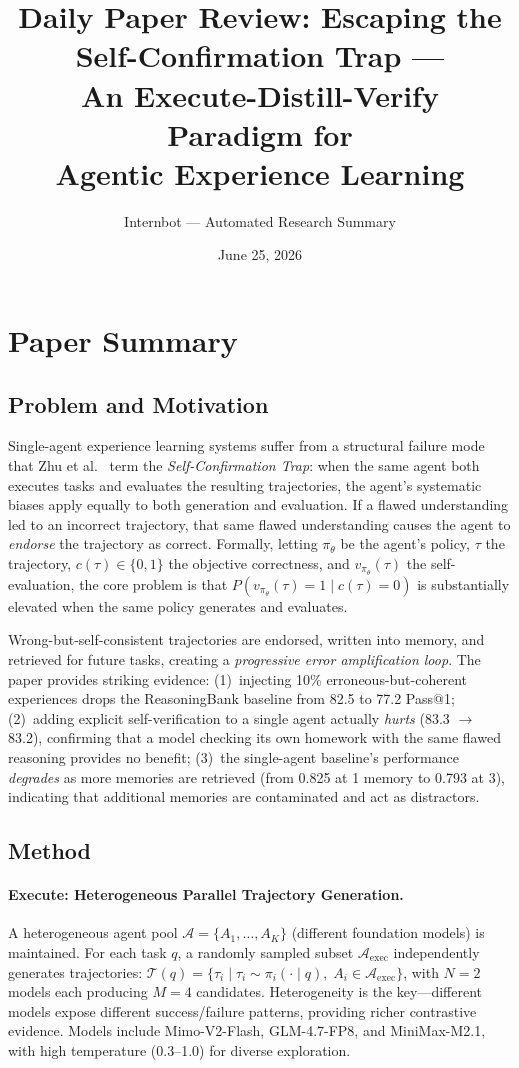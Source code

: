 \documentclass[11pt,a4paper]{article}
\title{Daily Paper Review: Escaping the Self-Confirmation Trap ---\\An Execute-Distill-Verify Paradigm for\\Agentic Experience Learning}
\author{Internbot --- Automated Research Summary}
\date{June 25, 2026}
\begin{document}
\maketitle

\section{Paper Summary}

\subsection{Problem and Motivation}

Single-agent experience learning systems suffer from a structural failure mode that Zhu et al.~\cite{zhu2026edv} term the \emph{Self-Confirmation Trap}: when the same agent both executes tasks and evaluates the resulting trajectories, the agent's systematic biases apply equally to both generation and evaluation. If a flawed understanding led to an incorrect trajectory, that same flawed understanding causes the agent to \emph{endorse} the trajectory as correct. Formally, letting $\pi_\theta$ be the agent's policy, $\tau$ the trajectory, $c(\tau) \in \{0,1\}$ the objective correctness, and $v_{\pi_\theta}(\tau)$ the self-evaluation, the core problem is that $P(v_{\pi_\theta}(\tau) = 1 \mid c(\tau) = 0)$ is substantially elevated when the same policy generates and evaluates.

Wrong-but-self-consistent trajectories are endorsed, written into memory, and retrieved for future tasks, creating a \emph{progressive error amplification loop}. The paper provides striking evidence: (1)~injecting 10\% erroneous-but-coherent experiences drops the ReasoningBank baseline from 82.5 to 77.2 Pass@1; (2)~adding explicit self-verification to a single agent actually \emph{hurts} (83.3 $\to$ 83.2), confirming that a model checking its own homework with the same flawed reasoning provides no benefit; (3)~the single-agent baseline's performance \emph{degrades} as more memories are retrieved (from 0.825 at 1 memory to 0.793 at 3), indicating that additional memories are contaminated and act as distractors.

\subsection{Method}

\paragraph{Execute: Heterogeneous Parallel Trajectory Generation.}
A heterogeneous agent pool $\mathcal{A} = \{A_1, \ldots, A_K\}$ (different foundation models) is maintained. For each task $q$, a randomly sampled subset $\mathcal{A}_{\mathrm{exec}}$ independently generates trajectories: $\mathcal{T}(q) = \{\tau_i \mid \tau_i \sim \pi_i(\cdot \mid q),\; A_i \in \mathcal{A}_{\mathrm{exec}}\}$, with $N=2$ models each producing $M=4$ candidates. Heterogeneity is the key---different models expose different success/failure patterns, providing richer contrastive evidence. Models include Mimo-V2-Flash, GLM-4.7-FP8, and MiniMax-M2.1, with high temperature (0.3--1.0) for diverse exploration.
\end{document}
